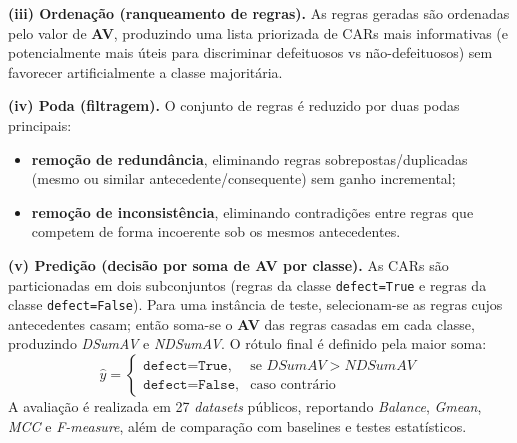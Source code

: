 \textbf{(iii) Ordenação (ranqueamento de regras).}
As regras geradas são ordenadas pelo valor de \textbf{AV}, produzindo uma lista priorizada de CARs mais informativas (e potencialmente mais úteis para discriminar defeituosos vs não-defeituosos) sem favorecer artificialmente a classe majoritária.

\textbf{(iv) Poda (filtragem).}
O conjunto de regras é reduzido por duas podas principais:
\begin{itemize}
    \item \textbf{remoção de redundância}, eliminando regras sobrepostas/duplicadas (mesmo ou similar antecedente/consequente) sem ganho incremental;
    \item \textbf{remoção de inconsistência}, eliminando contradições entre regras que competem de forma incoerente sob os mesmos antecedentes.
\end{itemize}

\textbf{(v) Predição (decisão por soma de AV por classe).}
As CARs são particionadas em dois subconjuntos (regras da classe \texttt{defect=True} e regras da classe \texttt{defect=False}). Para uma instância de teste, selecionam-se as regras cujos antecedentes casam; então soma-se o \textbf{AV} das regras casadas em cada classe, produzindo \textit{DSumAV} e \textit{NDSumAV}. O rótulo final é definido pela maior soma:
\[
\hat{y}=
\begin{cases}
\texttt{defect=True}, & \text{se } DSumAV > NDSumAV\\
\texttt{defect=False}, & \text{caso contrário}
\end{cases}
\]
A avaliação é realizada em 27 \textit{datasets} públicos, reportando \textit{Balance}, \textit{Gmean}, \textit{MCC} e \textit{F-measure}, além de comparação com baselines e testes estatísticos.

